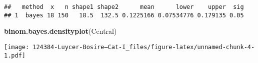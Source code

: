 \documentclass[
]{article}
\newenvironment{Shaded}{\begin{snugshade}}{\end{snugshade}}
\newcommand{\KeywordTok}[1]{\textcolor[rgb]{0.13,0.29,0.53}{\textbf{#1}}}
\newcommand{\NormalTok}[1]{#1}
\begin{document}
\begin{verbatim}
##   method  x   n shape1 shape2      mean      lower    upper  sig
## 1  bayes 18 150   18.5  132.5 0.1225166 0.07534776 0.179135 0.05
\end{verbatim}

\begin{Shaded}
\begin{Highlighting}[]
\KeywordTok{binom.bayes.densityplot}\NormalTok{(Central)}
\end{Highlighting}
\end{Shaded}

\texttt{[image: 124384-Luycer-Bosire---Cat-I\_files/figure-latex/unnamed-chunk-4-1.pdf]}
\end{document}
